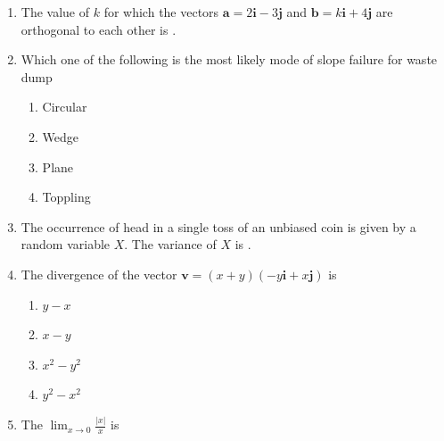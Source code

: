 \documentclass[journal,12pt,onecolumn]{IEEEtran}
\theoremstyle{remark}
\begin{document}
\begin{enumerate}
\hfill{}
\begin{multicols}{4}
\begin{enumerate}
\item $k \geq 0$ 
\item $k \leq 0$ 
\item $k=0$
\item $k=e$
\end{enumerate}
\end{multicols}
\item The value of $k$ for which the vectors $\mathbf{a} = 2\mathbf{i} - 3\mathbf{j}$ and $\mathbf{b} = k \mathbf{i} + 4 \mathbf{j}$ are orthogonal to each other is \underline{\hspace{2cm}}.

\item Which one of the following is the most likely mode of slope failure for waste dump

\hfill{}

\begin{multicols}{2}
\begin{enumerate}
\item Circular 
\item Wedge  
\item Plane
\item Toppling
  
\end{enumerate}
\end{multicols}
\item \quad The occurrence of head in a single toss of an unbiased coin is given by a random variable $X$. The variance of $X$ is \underline{\hspace{3cm}}.

\hfill{}

\item The divergence of the vector $\mathbf{v} = (x+y)(-y \mathbf{i} + x \mathbf{j})$ is

\hfill{}
\begin{multicols}{4}
\begin{enumerate}
\item $y - x$
\item $x - y$
\item $x^2 - y^2$
\item $y^2 - x^2$
\end{enumerate}
\end{multicols}


\item The $\displaystyle \lim_{x \to 0} \frac{|x|}{x}$ is


\end{enumerate}
\end{document}

